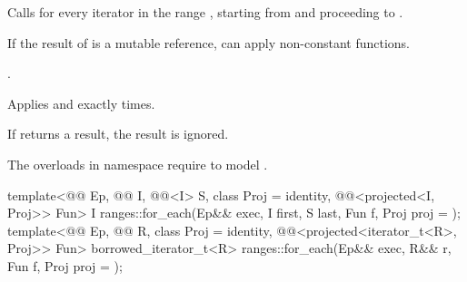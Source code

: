 \begin{itemdescr}
\pnum
\effects
Calls 
for every iterator  in the range ,
starting from  and proceeding to .
\begin{note}
If the result of  is a mutable reference,
 can apply non-constant functions.
\end{note}

\pnum
\returns
{}.

\pnum
\complexity
Applies  and  exactly  times.

\pnum
\remarks
If  returns a result, the result is ignored.

\pnum
\begin{note}
The overloads in namespace  require
 to model .
\end{note}
\end{itemdescr}

\begin{itemdecl}
template<@@ Ep, @@ I, @@<I> S,
         class Proj = identity,
         @@<projected<I, Proj>> Fun>
  I ranges::for_each(Ep&& exec, I first, S last, Fun f, Proj proj = {});
template<@@ Ep, @@ R, class Proj = identity,
         @@<projected<iterator_t<R>, Proj>> Fun>
  borrowed_iterator_t<R>
    ranges::for_each(Ep&& exec, R&& r, Fun f, Proj proj = {});
\end{itemdecl}

